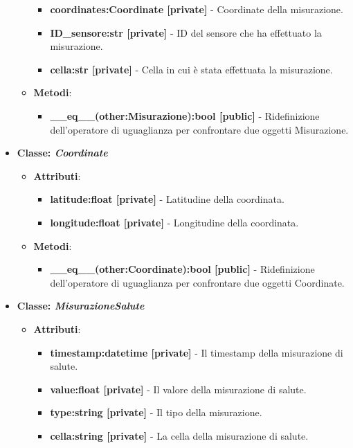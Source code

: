 \begin{itemize}
\begin{itemize}
\begin{itemize}
        \item \textbf{coordinates:Coordinate [private]} - Coordinate della misurazione.
        \item \textbf{ID\_sensore:str [private]} - ID del sensore che ha effettuato la misurazione.
        \item \textbf{cella:str [private]} - Cella in cui è stata effettuata la misurazione.
    \end{itemize}
    \item   \textbf{Metodi}: 
    \begin{itemize}
        \item \textbf{\_\_eq\_\_(other:Misurazione):bool [public]} - Ridefinizione dell'operatore di uguaglianza per confrontare due oggetti Misurazione.
    \end{itemize}
\end{itemize}
    \item\textbf{Classe: \textit{Coordinate}}
    \begin{itemize}
        \item    \textbf{Attributi}: 
    \begin{itemize}
        \item \textbf{latitude:float [private]} - Latitudine della coordinata.
        \item \textbf{longitude:float [private]} - Longitudine della coordinata.
    \end{itemize}
    \item     \textbf{Metodi}: 
    \begin{itemize}
        \item \textbf{\_\_eq\_\_(other:Coordinate):bool [public]} - Ridefinizione dell'operatore di uguaglianza per confrontare due oggetti Coordinate.
    \end{itemize}
\end{itemize}
\item\textbf{Classe: \textit{MisurazioneSalute}}
    \begin{itemize}
    \item\textbf{Attributi}:
        \begin{itemize}
        \item \textbf{timestamp:datetime [private]} - Il timestamp della misurazione di salute.
        \item \textbf{value:float [private]} - Il valore della misurazione di salute.
        \item \textbf{type:string [private]} - Il tipo della misurazione.
        \item \textbf{cella:string [private]} - La cella della misurazione di salute.

\end{itemize}
\end{itemize}
\end{itemize}

